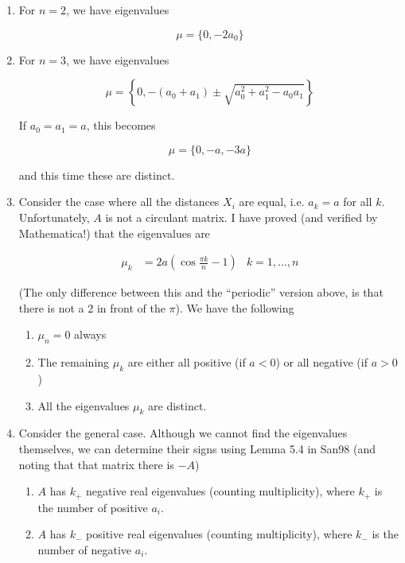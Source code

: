 \documentclass[12pt]{article}
\begin{document}
\begin{enumerate}

\item For $n = 2$, we have eigenvalues

\[
\mu = \{ 0, -2 a_0 \}
\]

\item For $n = 3$, we have eigenvalues

\[
\mu = \left\{ 0,  -(a_0 + a_1) \pm 
\sqrt{a_0^2 + a_1^2 - a_0 a_1} \right\}
\]

If $a_0 = a_1 = a$, this becomes

\[
\mu = \{0,  -a, -3a \}
\]

and this time these are distinct.

\item Consider the case where all the distances $X_i$ are equal, i.e. $a_k = a$ for all $k$. Unfortunately, $A$ is not a circulant matrix. I have proved (and verified by Mathematica!) that the eigenvalues are 

\begin{align*}
\mu_k &= 2 a\left( \cos \frac{\pi k}{n}  - 1 \right) & k = 1, \dots, n
\end{align*}

(The only difference between this and the ``periodic'' version above, is that there is not a 2 in front of the $\pi$). We have the following

\begin{enumerate}
	\item $\mu_n = 0$ always
	\item The remaining $\mu_k$ are either all positive (if $a < 0$) or all negative (if $a > 0$)
	\item All the eigenvalues $\mu_k$ are distinct. 
\end{enumerate}

\item Consider the general case. Although we cannot find the eigenvalues themselves, we can determine their signs using Lemma 5.4 in San98 (and noting that that matrix there is $-A$)

\begin{enumerate}
	\item $A$ has $k_+$ negative real eigenvalues (counting multiplicity), where $k_+$ is the number of positive $a_i$.
	\item $A$ has $k_-$ positive real eigenvalues (counting multiplicity), where $k_-$ is the number of negative $a_i$.
\end{enumerate}

\end{enumerate}
\end{document}
